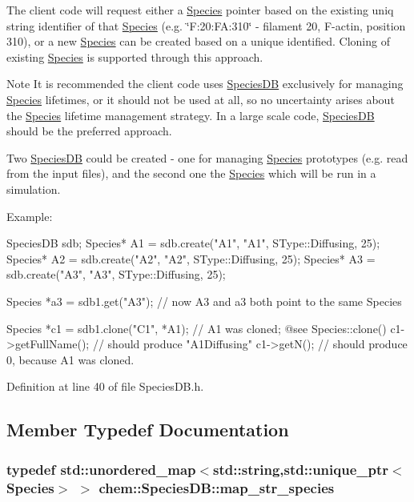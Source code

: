 The client code will request either a \hyperlink{classchem_1_1Species}{Species} pointer based on the existing uniq string identifier of that \hyperlink{classchem_1_1Species}{Species} (e.\-g. \char`\"{}\-F\-:20\-:\-F\-A\-:310\char`\"{} -\/ filament 20, F-\/actin, position 310), or a new \hyperlink{classchem_1_1Species}{Species} can be created based on a unique identified. Cloning of existing \hyperlink{classchem_1_1Species}{Species} is supported through this approach.

\begin{DoxyNote}{Note}
It is recommended the client code uses \hyperlink{classchem_1_1SpeciesDB}{Species\-D\-B} exclusively for managing \hyperlink{classchem_1_1Species}{Species} lifetimes, or it should not be used at all, so no uncertainty arises about the \hyperlink{classchem_1_1Species}{Species} lifetime management strategy. In a large scale code, \hyperlink{classchem_1_1SpeciesDB}{Species\-D\-B} should be the preferred approach. 

Two \hyperlink{classchem_1_1SpeciesDB}{Species\-D\-B} could be created -\/ one for managing \hyperlink{classchem_1_1Species}{Species} prototypes (e.\-g. read from the input files), and the second one the \hyperlink{classchem_1_1Species}{Species} which will be run in a simulation.
\end{DoxyNote}
Example\-: 
\begin{DoxyCode}
    SpeciesDB sdb;
    Species* A1 = sdb.create("A1", "A1", SType::Diffusing, 25);
    Species* A2 = sdb.create("A2", "A2", SType::Diffusing, 25);
    Species* A3 = sdb.create("A3", "A3", SType::Diffusing, 25);

    Species *a3 = sdb1.get("A3"); // now A3 and a3 both point to the same
       Species

    Species *c1 = sdb1.clone("C1", *A1); // A1 was cloned; @see
       Species::clone()
    c1->getFullName(); // should produce "A1{Diffusing}"
    c1->getN(); // should produce 0, because A1 was cloned.
\end{DoxyCode}
 

Definition at line 40 of file Species\-D\-B.\-h.



\subsection{Member Typedef Documentation}
\hypertarget{classchem_1_1SpeciesDB_a158e832778baeefa4add8b27f4e0bdec}{
\subsubsection[{map\-\_\-str\-\_\-species}]{\setlength{\rightskip}{0pt plus 5cm}typedef std\-::unordered\-\_\-map$<$std\-::string,std\-::unique\-\_\-ptr$<${\bf Species}$>$ $>$ {\bf chem\-::\-Species\-D\-B\-::map\-\_\-str\-\_\-species}}}\label{classchem_1_1SpeciesDB_a158e832778baeefa4add8b27f4e0bdec}


